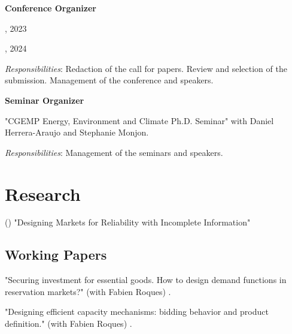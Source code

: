 \documentclass[letterpaper]{article}
\newcommand{\MYhref}[3][darkblue]{\href{#2}{\color{#1}{#3}}}%
\renewenvironment{itemize}{
  \begin{list}{}{
    \setlength{\leftmargin}{1.5em}
  }
}{
  \end{list}
}
\begin{document}
\begin{itemize}

\item \textbf{Conference Organizer}

\item \textcolor{darkcerulean}{\MYhref{https://leopoldmonjoie.com/files/Programme_PhD_Day.pdf}{"1rst CEEM Ph.D. Conference - Toward a new electricity market model?"}}, 2023

\textcolor{darkcerulean}{\MYhref{https://leopoldmonjoie.com/files/Programme_PhD_Day_2.pdf}{"2nd CEEM Ph.D. Conference - Key issues for electricity market design"}}, 2024

\textit{Responsibilities}: Redaction of the call for papers. Review and selection of the submission. Management of the conference and speakers.

\item \textbf{Seminar Organizer}
\item "CGEMP Energy, Environment and Climate Ph.D. Seminar" with Daniel Herrera-Araujo and Stephanie Monjon.

\textit{Responsibilities}: Management of the seminars and speakers.

\end{itemize}




\section*{\textbf{Research}}

\begin{itemize}
\item (\textcolor{darkblue}{\MYhref{http://leopoldmonjoie.com/files/monjoie_jmp.pdf}{\textbf{JMP}}})  
 "Designing Markets for Reliability with Incomplete Information"
\end{itemize}


\subsection*{Working Papers}

\begin{itemize}
\item "Securing investment for essential goods. How to design demand functions in reservation markets?" (with Fabien Roques)   \textcolor{darkblue}{\MYhref{http://leopoldmonjoie.com/files/WP_Leopold_Monjoie.pdf}{2022 CEEM Working Paper 55}}.
\item "Designing efficient capacity mechanisms: bidding behavior and product definition."  (with Fabien Roques)  \textcolor{darkblue}{\MYhref{http://leopoldmonjoie.com/files/WP54_Designing_efficient_capacity_mechanisms_bidding_behavior_and_product_definition_.pdf}{2021 CEEM Working Paper 54}}.
\end{itemize}
\end{document}
